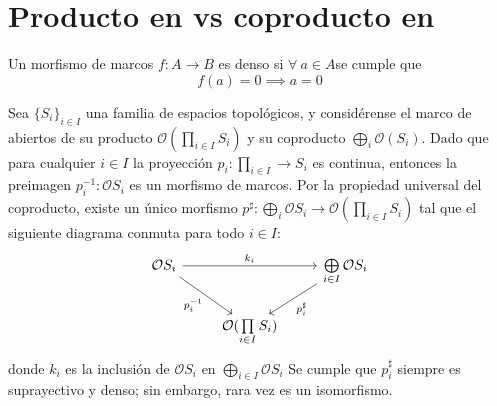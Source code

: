 \chapter{Producto en  vs coproducto en }
\begin{defn}
    Un morfismo de marcos $f:A\to B$ es denso si $\forall \ a\in A$se cumple que
    $$f(a)=0\implies a=0$$
\end{defn}
Sea $\{S_i\}_{i\in I}$ una familia de espacios topológicos, y considérense el marco de abiertos de su producto $\mathcal{O}(\prod\limits_{i\in I}S_i)$ y su coproducto $\bigoplus\limits_{i}\mathcal{O}(S_i)$. Dado que para cualquier $i\in I$ la proyección $p_i:\prod\limits_{i\in I}\to S_i$ es continua, entonces la preimagen $p_i^{-1}:\mathcal{O}S_i$
es un morfismo de marcos. Por la propiedad universal del coproducto, existe un único morfismo $p^\sharp:\bigoplus\limits_{i}\mathcal{O}S_i\to\mathcal{O}(\prod\limits_{i\in I}S_i)$ tal que el siguiente diagrama conmuta para todo $i\in I$:
 \[
            \begin{tikzcd}
                \mathcal{O}S_i \ar[dr,"p_i^{-1}"'] \ar[rr,"k_i"] && \bigoplus\limits_{i\in I}\mathcal{O}S_i \ar[dl,"p_i^\sharp"]
                \\ & \mathcal{O}(\prod\limits_{i\in I}S_i)
            \end{tikzcd}
        \]
donde $k_i$ es la inclusión de $\mathcal{O}S_i$ en $\bigoplus\limits_{i\in I}\mathcal{O}S_i$
Se cumple que $p_i^\sharp$ siempre es suprayectivo y denso; sin embargo, rara vez es un isomorfismo.

